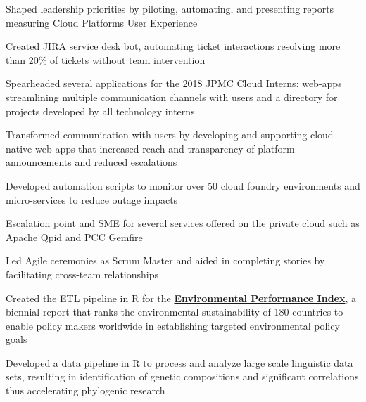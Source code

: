 \documentclass[]{deedy-resume-openfont}
\begin{document}
\begin{tightemize}
\item Shaped leadership priorities by piloting, automating, and presenting reports measuring Cloud Platforms User Experience
\item Created JIRA service desk bot, automating ticket interactions resolving more than 20\% of tickets without team intervention
\item Spearheaded several applications for the 2018 JPMC Cloud Interns: web-apps streamlining multiple communication channels with users and a directory for projects developed by all technology interns
\item Transformed communication with users by developing and supporting cloud native web-apps that increased reach and transparency of platform announcements and reduced escalations
\item Developed automation scripts to monitor over 50 cloud foundry environments and micro-services to reduce outage impacts
\item Escalation point and SME for several services offered on the private cloud such as Apache Qpid and PCC Gemfire
\item Led Agile ceremonies as Scrum Master and aided in completing stories by facilitating cross-team relationships
\end{tightemize}
\sectionsep

\begin{tightemize}
\item Created the ETL pipeline in R for the \textbf{\href{https://epi.envirocenter.yale.edu/epi-team}{Environmental Performance Index}}, a biennial report that ranks the environmental sustainability of 180 countries to enable policy makers worldwide in establishing targeted environmental policy goals
\end{tightemize}
\sectionsep

\begin{tightemize}
\item Developed a data pipeline in R to process and analyze large scale linguistic data sets, resulting in identification of genetic compositions and significant correlations thus accelerating phylogenic research
\end{tightemize}
\end{document}
